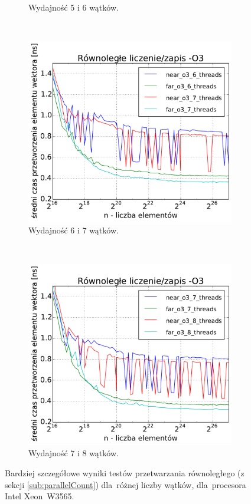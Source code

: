 \begin{figure}[!h]
\begin{subfigure}[c]{0.45\textwidth}
        \caption{Wydajność 5 i 6 wątków.}
    \end{subfigure}
    \\
    \vspace{0.5cm}
    \begin{subfigure}[c]{0.45\textwidth}
        \centering
        \includegraphics[width=\textwidth]{images/benchs_xeon/parallel_count_interesting5}
        \caption{Wydajność 6 i 7 wątków.}
    \end{subfigure}
    ~
    \begin{subfigure}[c]{0.45\textwidth}
        \centering
        \includegraphics[width=\textwidth]{images/benchs_xeon/parallel_count_interesting6}
        \caption{Wydajność 7 i 8 wątków.}
    \end{subfigure}
    \caption{Bardziej szczegółowe wyniki testów przetwarzania równoległego (z sekcji \ref{sub:parallelCount}) dla~różnej liczby wątków, dla~procesora Intel \mbox{Xeon W3565}.}
    \label{fig:parallelCountInterestingXeon}
\end{figure}

